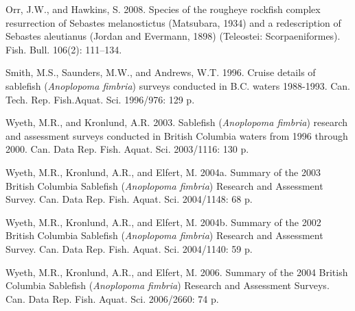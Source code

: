 \documentclass[12pt]{article}\usepackage[]{graphicx}\usepackage[]{color}
\begin{document}
\leavevmode\hypertarget{ref-Orr2008}{}%
Orr, J.W., and Hawkins, S. 2008. Species of the rougheye rockfish complex resurrection of Sebastes melanostictus (Matsubara, 1934) and a redescription of Sebastes aleutianus (Jordan and Evermann, 1898) (Teleostei: Scorpaeniformes). Fish. Bull. 106(2): 111--134.

\leavevmode\hypertarget{ref-Smith1996}{}%
Smith, M.S., Saunders, M.W., and Andrews, W.T. 1996. Cruise details of sablefish (\emph{Anoplopoma fimbria}) surveys conducted in B.C. waters 1988-1993. Can. Tech. Rep. Fish.Aquat. Sci. 1996/976: 129 p.

\leavevmode\hypertarget{ref-Wyeth2003}{}%
Wyeth, M.R., and Kronlund, A.R. 2003. Sablefish (\emph{Anoplopoma fimbria}) research and assessment surveys conducted in British Columbia waters from 1996 through 2000. Can. Data Rep. Fish. Aquat. Sci. 2003/1116: 130 p.

\leavevmode\hypertarget{ref-Wyeth2004b}{}%
Wyeth, M.R., Kronlund, A.R., and Elfert, M. 2004a. Summary of the 2003 British Columbia Sablefish (\emph{Anoplopoma fimbria}) Research and Assessment Survey. Can. Data Rep. Fish. Aquat. Sci. 2004/1148: 68 p.

\leavevmode\hypertarget{ref-Wyeth2004a}{}%
Wyeth, M.R., Kronlund, A.R., and Elfert, M. 2004b. Summary of the 2002 British Columbia Sablefish (\emph{Anoplopoma fimbria}) Research and Assessment Survey. Can. Data Rep. Fish. Aquat. Sci. 2004/1140: 59 p.

\leavevmode\hypertarget{ref-Wyeth2006}{}%
Wyeth, M.R., Kronlund, A.R., and Elfert, M. 2006. Summary of the 2004 British Columbia Sablefish (\emph{Anoplopoma fimbria}) Research and Assessment Surveys. Can. Data Rep. Fish. Aquat. Sci. 2006/2660: 74 p.
\end{document}
